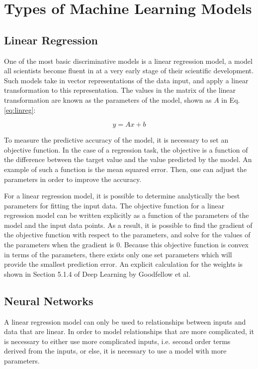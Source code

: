 \section{Types of Machine Learning Models} 

\subsection{Linear Regression}

One of the most basic discriminative models is a linear regression model, a model all scientists become fluent in at a very early stage of their scientific development. Such models take in vector representations of the data input, and apply a linear transformation to this representation. The values in the matrix of the linear transformation are known as the parameters of the model, shown as $A$ in Eq. \eqref{eq:linreg}:

\begin{equation}\label{eq:linreg}
  y = Ax + b
\end{equation}

To measure the predictive accuracy of the model, it is necessary to set an objective function. In the case of a regression task, the objective is a function of the difference between the target value and the value predicted by the model. An example of such a function is the mean squared error. Then, one can adjust the parameters in order to improve the accuracy.

For a linear regression model, it is possible to determine analytically the best parameters for fitting the input data. The objective function for a linear regression model can be written explicitly as a function of the parameters of the model and the input data points. 
As a result, it is possible to find the gradient of the objective function with respect to the parameters, and solve for the values of the parameters when the gradient is 0. Because this objective function is convex in terms of the parameters, there exists only one set parameters which will provide the smallest prediction error. An explicit calculation for the weights is shown in Section 5.1.4 of Deep Learning by Goodfellow et al\cite{Goodfellow-et-al-2016}.

\subsection{Neural Networks}

A linear regression model can only be used to relationships between inputs and data that are linear. In order to model relationships that are more complicated, it is necessary to either use more complicated inputs, i.e. second order terms derived from the inputs, or else, it is necessary to use a model with more parameters.

